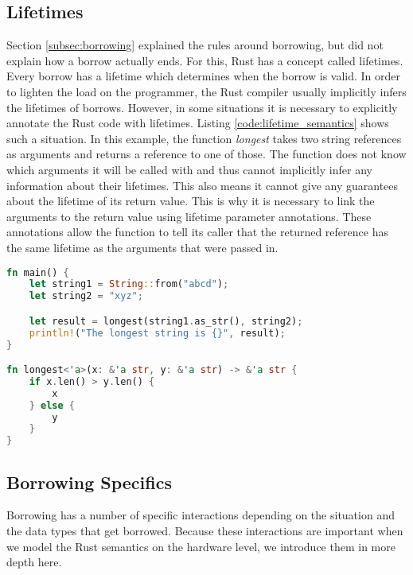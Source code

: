 \subsection{Lifetimes}
Section \ref{subsec:borrowing} explained the rules around borrowing, but did not explain how a borrow actually ends.
For this, Rust has a concept called lifetimes.
Every borrow has a lifetime which determines when the borrow is valid.
In order to lighten the load on the programmer, the Rust compiler usually implicitly infers the lifetimes of borrows.
However, in some situations it is necessary to explicitly annotate the Rust code with lifetimes.
Listing \ref{code:lifetime_semantics} shows such a situation.
In this example, the function \textit{longest} takes two string references as arguments and returns a reference to one of those.
The function does not know which arguments it will be called with and thus cannot implicitly infer any information about their lifetimes.
This also means it cannot give any guarantees about the lifetime of its return value.
This is why it is necessary to link the arguments to the return value using lifetime parameter annotations.
These annotations allow the function to tell its caller that the returned reference has the same lifetime as the arguments that were passed in.
\begin{lstlisting}[language=Rust,frame=single,caption=Lifetime Example,label=code:lifetime_semantics]
fn main() {
    let string1 = String::from("abcd");
    let string2 = "xyz";

    let result = longest(string1.as_str(), string2);
    println!("The longest string is {}", result);
}

fn longest<'a>(x: &'a str, y: &'a str) -> &'a str {
    if x.len() > y.len() {
        x
    } else {
        y
    }
}
\end{lstlisting} %
\label{fig:lifetime_semantics}

\subsection{Borrowing Specifics}
Borrowing has a number of specific interactions depending on the situation and the data types that get borrowed.
Because these interactions are important when we model the Rust semantics on the hardware level, we introduce them in more depth here.

